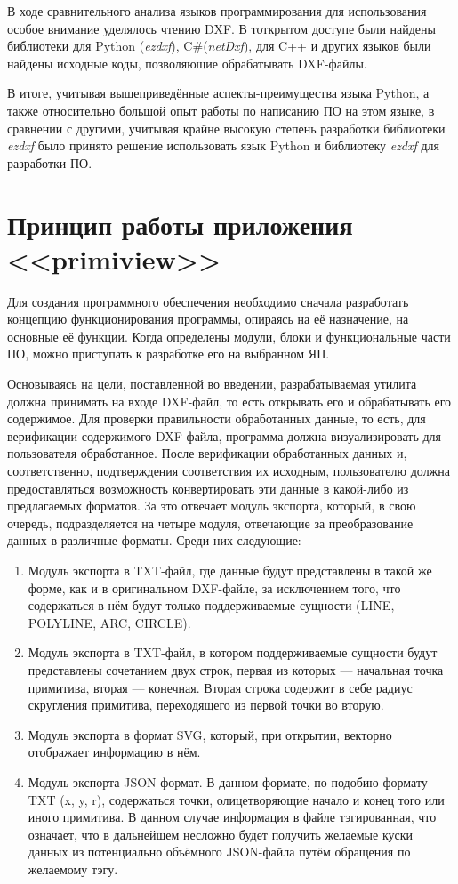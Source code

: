 В ходе сравнительного анализа языков программирования для использования особое внимание уделялось чтению DXF. В тоткрытом доступе были найдены библиотеки для Python (\textit{ezdxf}), C\#(\textit{netDxf}), для C++ и других языков были найдены исходные коды, позволяющие обрабатывать DXF-файлы.

В итоге, учитывая вышеприведённые аспекты-преимущества языка Python, а также относительно большой опыт работы по написанию ПО на этом языке, в сравнении с другими, учитывая крайне высокую степень разработки библиотеки \textit{ezdxf} было принято решение использовать язык Python и библиотеку \textit{ezdxf} для разработки ПО.


\section{Принцип работы приложения <<primiview>>}

Для создания программного обеспечения необходимо сначала разработать концепцию функционирования программы, опираясь на её назначение, на основные её функции. Когда определены модули, блоки и функциональные части ПО, можно приступать к разработке его на выбранном ЯП.

Основываясь на цели, поставленной во введении, разрабатываемая утилита должна принимать на входе DXF-файл, то есть открывать его и обрабатывать его содержимое. Для проверки правильности обработанных данные, то есть, для верификации содержимого DXF-файла, программа должна визуализировать для пользователя обработанное. После верификации обработанных данных и, соответственно, подтверждения соответствия их исходным, пользователю должна предоставляться возможность конвертировать эти данные в какой-либо из предлагаемых форматов. За это отвечает модуль экспорта, который, в свою очередь, подразделяется на четыре модуля, отвечающие за преобразование данных в различные форматы. Среди них следующие:

\begin{enumerate}
	\item Модуль экспорта в TXT-файл, где данные будут представлены в такой же форме, как и в оригинальном DXF-файле, за исключением того, что содержаться в нём будут только поддерживаемые сущности (LINE, POLYLINE, ARC, CIRCLE).
	\item Модуль экспорта в TXT-файл, в котором поддерживаемые сущности будут представлены сочетанием двух строк, первая из которых --- начальная точка примитива, вторая --- конечная. Вторая строка содержит в себе радиус скругления примитива, переходящего из первой точки во вторую.
	\item Модуль экспорта в формат SVG, который, при открытии, векторно отображает информацию в нём.
	\item Модуль экспорта JSON-формат. В данном формате, по подобию формату TXT (x, y, r), содержаться точки, олицетворяющие начало и конец того или иного примитива. В данном случае информация в файле тэгированная, что означает, что в дальнейшем несложно будет получить желаемые куски данных из потенциально объёмного JSON-файла путём обращения по желаемому тэгу.
\end{enumerate}



